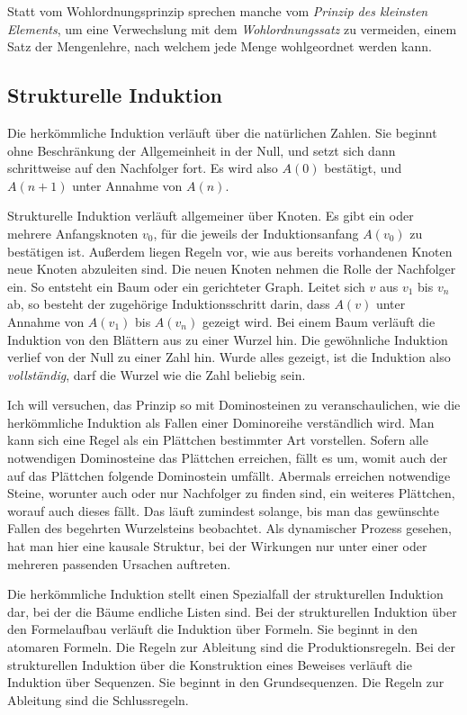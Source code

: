 Statt vom Wohlordnungsprinzip sprechen manche vom \emph{Prinzip des
kleinsten Elements}, um eine Verwechslung mit dem \emph{Wohlordnungssatz}
zu vermeiden, einem Satz der Mengenlehre, nach welchem jede
Menge wohlgeordnet werden kann.

\subsection{Strukturelle Induktion}

Die herkömmliche Induktion verläuft über die natürlichen Zahlen.
Sie beginnt ohne Beschränkung der Allgemeinheit in der Null, und setzt
sich dann schrittweise auf den Nachfolger fort. Es wird also $A(0)$
bestätigt, und $A(n+1)$ unter Annahme von $A(n)$.

Strukturelle Induktion verläuft allgemeiner über Knoten. Es gibt ein
oder mehrere Anfangsknoten $v_0$, für die jeweils der Induktionsanfang $A(v_0)$
zu bestätigen ist. Außerdem liegen Regeln vor, wie aus bereits vorhandenen
Knoten neue Knoten abzuleiten sind. Die neuen Knoten nehmen die Rolle der
Nachfolger ein. So entsteht ein Baum oder ein gerichteter Graph.
Leitet sich $v$ aus $v_1$ bis $v_n$ ab, so besteht der zugehörige
Induktionsschritt darin, dass $A(v)$ unter Annahme von $A(v_1)$
bis $A(v_n)$ gezeigt wird. Bei einem Baum verläuft die Induktion von
den Blättern aus zu einer Wurzel hin. Die gewöhnliche Induktion verlief
von der Null zu einer Zahl hin. Wurde alles gezeigt, ist die Induktion
also \emph{vollständig}, darf die Wurzel wie die Zahl beliebig sein.

Ich will versuchen, das Prinzip so mit Dominosteinen zu veranschaulichen,
wie die herkömmliche Induktion als Fallen einer Dominoreihe verständlich
wird. Man kann sich eine Regel als ein Plättchen bestimmter Art vorstellen.
Sofern alle notwendigen Dominosteine das Plättchen erreichen, fällt es
um, womit auch der auf das Plättchen folgende Dominostein umfällt.
Abermals erreichen notwendige Steine, worunter auch oder nur Nachfolger
zu finden sind, ein weiteres Plättchen, worauf auch dieses fällt.
Das läuft zumindest solange, bis man das gewünschte Fallen des
begehrten Wurzelsteins beobachtet. Als dynamischer Prozess gesehen,
hat man hier eine kausale Struktur, bei der Wirkungen nur unter einer
oder mehreren passenden Ursachen auftreten.

Die herkömmliche Induktion stellt einen Spezialfall der strukturellen
Induktion dar, bei der die Bäume endliche Listen sind. Bei
der strukturellen Induktion über den Formelaufbau verläuft die Induktion
über Formeln. Sie beginnt in den atomaren Formeln. Die Regeln zur
Ableitung sind die Produktionsregeln. Bei der strukturellen Induktion
über die Konstruktion eines Beweises verläuft die Induktion über
Sequenzen. Sie beginnt in den Grundsequenzen. Die Regeln zur Ableitung
sind die Schlussregeln.

